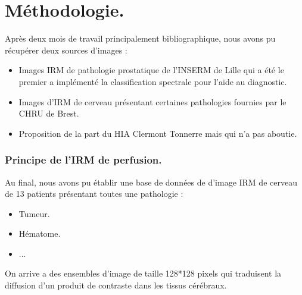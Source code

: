 \documentclass{beamer}
\begin{document}

\section{Méthodologie.}


\begin{frame}

Après deux mois de travail principalement bibliographique, nous avons pu récupérer deux sources d'images :

\begin{itemize}
\item Images IRM de pathologie prostatique de l'INSERM de Lille qui a été le premier a implémenté la classification spectrale pour l'aide au diagnostic.
\item Images d'IRM de cerveau présentant certaines pathologies fournies par le CHRU de Brest.
\item Proposition de la part du HIA Clermont Tonnerre mais qui n'a pas aboutie.
\end{itemize}

\end{frame}

\begin{frame}
\frametitle{Principe de l'IRM de perfusion.}



\end{frame}

\begin{frame}

Au final, nous avons pu établir une base de données de d'image IRM de cerveau de 13 patients présentant toutes une pathologie :

\begin{itemize}
\item Tumeur.
\item Hématome.
\item ...
\end{itemize} 

On arrive a des ensembles d'image de taille 128*128 pixels qui traduisent la diffusion d'un produit de contraste dans les tissus cérébraux.

\end{frame}
\end{document}
